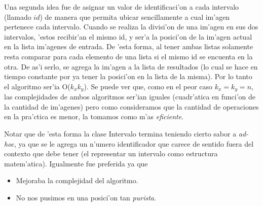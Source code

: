 Una segunda idea fue de asignar un valor de identificaci'on a cada intervalo (llamado $id$) de manera que permita ubicar sencillamente a cual im'agen pertenece cada intervalo. Cuando se realiza la divisi'on de una im'agen en sus dos intervalos, 'estos recibir'an el mismo id, y ser'a la posici'on de la im'agen actual en la lista im'agenes de entrada. De 'esta forma, al tener ambas listas solamente resta comparar para cada elemento de una lista si el mismo id se encuenta en la otra. De as'i serlo, se agrega la im'agen a la lista de resultados (lo cual se hace en tiempo constante por ya tener la posici'on en la lista de la misma). Por lo tanto el algoritmo ser'ia O($k_xk_y$). Se puede ver que, como en el peor caso $k_x = k_y = n$, las complejidades de ambos algoritmos ser'ian iguales (cuadr'atica en funci'on de la cantidad de im'agenes) pero como consideramos que la cantidad de operaciones en la pra'ctica es menor, la tomamos como m'as \emph{eficiente}.

Notar que de 'esta forma la clase Intervalo termina teniendo cierto sabor a \emph{ad-hoc}, ya que se le agrega un n'umero identificador que carece de sentido fuera del contexto que debe tener (el representar un intervalo como estructura matem'atica). Igualmente fue preferida ya que
\begin{itemize}
\item Mejoraba la complejidad del algoritmo.
\item No nos pusimos en una posici'on tan \emph{purista}.
\end{itemize}
